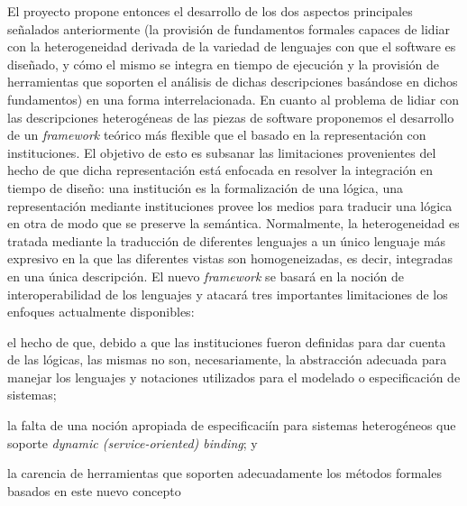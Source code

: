 \documentclass{article}
\begin{document}
  El proyecto propone entonces el desarrollo de los dos aspectos principales se\~nalados anteriormente (la provisi\'on de fundamentos formales capaces de lidiar con la heterogeneidad derivada de la variedad de lenguajes con que el software es dise\~nado, y c\'omo el mismo se integra en tiempo de ejecuci\'on y la provisi\'on de herramientas que soporten el an\'alisis de dichas descripciones bas\'andose en dichos fundamentos) en una forma interrelacionada. En cuanto al problema de lidiar con las descripciones heterog\'eneas de las piezas de software proponemos el desarrollo de un \emph{framework} te\'orico m\'as flexible que el basado en la representaci\'on con instituciones. El objetivo de esto es subsanar las limitaciones provenientes del hecho de que dicha representaci\'on est\'a enfocada en resolver la integraci\'on en tiempo de dise\~no: una instituci\'on es la formalizaci\'on de una l\'ogica, una representaci\'on mediante instituciones provee los medios para traducir una l\'ogica en otra de modo que se 
preserve la sem\'antica. Normalmente, la heterogeneidad es tratada mediante la traducci\'on de diferentes lenguajes a un \'unico lenguaje m\'as expresivo en la que las diferentes vistas son homogeneizadas, es decir, integradas en una \'unica descripci\'on. El nuevo \emph{framework} se basar\'a en la noci\'on de interoperabilidad de los lenguajes y atacar\'a tres importantes limitaciones de los enfoques actualmente disponibles:
  \begin{inparaenum}
  \item el hecho de que, debido a que las instituciones fueron definidas para dar cuenta de las l\'ogicas, las mismas no son, necesariamente, la abstracci\'on adecuada para manejar los lenguajes y notaciones utilizados para el modelado o especificaci\'on de sistemas;
  \item la falta de una noci\'on apropiada de especificaci\'in para sistemas heterog\'eneos que soporte \emph{dynamic (service-oriented) binding}; y
  \item la carencia de herramientas que soporten adecuadamente los m\'etodos formales basados en este nuevo concepto
  \end{inparaenum}
  
\end{document}
